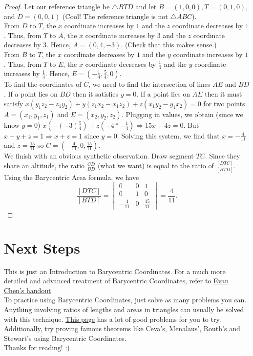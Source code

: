 \documentclass[11pt]{scrartcl}
\begin{document}
\begin{proof}
    Let our reference triangle be $\triangle BTD$ and let $B = (1,0,0), T = (0,1,0)$, and $D = (0,0,1)$ (Cool! The reference triangle is not $\triangle ABC$). \\

From $D$ to $T$, the $x$ coordinate increases by $1$ and the $z$ coordinate decreases by $1$. Thus, from $T$ to $A$, the $x$ coordinate increases by $3$ and the $z$ coordinate decreases by $3$. Hence, $A=(0,4,-3)$. (Check that this makes sense.) \\

From $B$ to $T$, the $x$ coordinate decreases by $1$ and the $y$ coordinate increases by $1$. Thus, from $T$ to $E$, the $x$ coordinate decreases by $\frac 14$ and the $y$ coordinate increases by $\frac 14$. Hence, $E=(-\frac 14,\frac 54,0)$. \\

To find the coordinates of $C$, we need to find the intersection of lines $AE$ and $BD$. If a point lies on $BD$ then it satisfies $y=0$. If a point lies on $AE$ then it must satisfy $x(y_1z_2 -z_1y_2)+y(z_1x_2-x_1z_2)+z(x_1y_2-y_1x_2)=0$ for two points $A=(x_1,y_1,z_1)$ and $E=(x_2,y_2,z_2)$. Plugging in values, we obtain (since we know $y=0$) $x(-(-3)\frac 54)+z(-4*-\frac 14) \Rightarrow 15x+4z=0$. But $x+y+z=1 \Rightarrow x+z=1$ since $y=0$. Solving this system, we find that $x=-\frac{4}{11}$ and $z=\frac{15}{11}$ so $C=(-\frac{4}{11},0,\frac{15}{11})$. \\

We finish with an obvious synthetic observation. Draw segment $TC$. Since they share an altitude, the ratio $\frac{CD}{BD}$ (what we want) is equal to the ratio of $\frac{[DTC]}{[BTD]}$. Using the Barycentric Area formula, we have $$\frac{[DTC]}{[BTD]}=\begin{vmatrix}
0 &0 &1 \\
0 &1 &0 \\
-\frac {4}{11}& 0&\frac {15}{11}
\end{vmatrix}=\frac{4}{11}.$$
\end{proof}




\section{Next Steps}

This is just an Introduction to Barycentric Coordinates. For a much more detailed and advanced treatment of Barycentric Coordinates, refer to \href{https://web.evanchen.cc/handouts/bary/bary-full.pdf}{Evan Chen's handout}. \\

To practice using Barycentric Coordinates, just solve as many problems you can. Anything involving ratios of lengths and areas in triangles can usually be solved with this technique. \href{https://artofproblemsolving.com/wiki/index.php/Mass_points}{This page} has a lot of good problems for you to try. Additionally, try proving famous theorems like Ceva's, Menalaus', Routh's and Stewart's using Barycentric Coordinates.\\

Thanks for reading! :)
\end{document}
